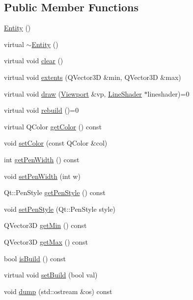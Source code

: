 \subsection*{Public Member Functions}
\begin{DoxyCompactItemize}
\item 
\hyperlink{classShipCAD_1_1Entity_a980f368aa07ce358583982821533a54a}{Entity} ()
\item 
virtual \hyperlink{classShipCAD_1_1Entity_a0fe3f9f7c8875a85afb214c8ebd75604}{$\sim$\+Entity} ()
\item 
virtual void \hyperlink{classShipCAD_1_1Entity_a998d0e5d360371046fd5835ba1e0877a}{clear} ()
\item 
virtual void \hyperlink{classShipCAD_1_1Entity_a08e8e53770c85002afa45f46e7bf10f8}{extents} (Q\+Vector3D \&min, Q\+Vector3D \&max)
\item 
virtual void \hyperlink{classShipCAD_1_1Entity_aa62e306d991140dcd564360f8f6e7539}{draw} (\hyperlink{classShipCAD_1_1Viewport}{Viewport} \&vp, \hyperlink{classShipCAD_1_1LineShader}{Line\+Shader} $\ast$lineshader)=0
\item 
virtual void \hyperlink{classShipCAD_1_1Entity_a2571654319df6ad6841a437be7a75395}{rebuild} ()=0
\item 
virtual Q\+Color \hyperlink{classShipCAD_1_1Entity_a747f437fa410f5b8b6251967fd3a90aa}{get\+Color} () const 
\item 
void \hyperlink{classShipCAD_1_1Entity_a5e0e5f174d287e807b5409b1aa5704bc}{set\+Color} (const Q\+Color \&col)
\item 
int \hyperlink{classShipCAD_1_1Entity_acf44d10747d8e1588030ef1e46155dfc}{get\+Pen\+Width} () const 
\item 
void \hyperlink{classShipCAD_1_1Entity_a1b8146f974735c90ea6a44a0cb5fba98}{set\+Pen\+Width} (int w)
\item 
Qt\+::\+Pen\+Style \hyperlink{classShipCAD_1_1Entity_a5912853854b82c79f47dd9117cc3d9bc}{get\+Pen\+Style} () const 
\item 
void \hyperlink{classShipCAD_1_1Entity_a50f556f934efd5517c984b09a2e17773}{set\+Pen\+Style} (Qt\+::\+Pen\+Style style)
\item 
Q\+Vector3D \hyperlink{classShipCAD_1_1Entity_a7c4227afa7a356a667224cfba69a24e5}{get\+Min} () const 
\item 
Q\+Vector3D \hyperlink{classShipCAD_1_1Entity_ad9e95df651ae01a48242604262b051b3}{get\+Max} () const 
\item 
bool \hyperlink{classShipCAD_1_1Entity_ab2f54a1745c95aa0871a8c57c114809e}{is\+Build} () const 
\item 
virtual void \hyperlink{classShipCAD_1_1Entity_a1889198398f42bb7f77a2334031c3f33}{set\+Build} (bool val)
\item 
void \hyperlink{classShipCAD_1_1Entity_a395d7573df06482d9deaecdc87d46944}{dump} (std\+::ostream \&os) const 
\end{DoxyCompactItemize}
